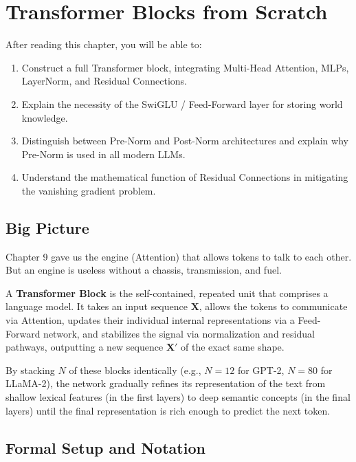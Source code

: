 \chapter{Transformer Blocks from Scratch}
\label{ch:10}

\begin{keyinsight}
After reading this chapter, you will be able to:
\begin{enumerate}
  \item Construct a full Transformer block, integrating Multi-Head Attention, MLPs, LayerNorm, and Residual Connections.
  \item Explain the necessity of the SwiGLU / Feed-Forward layer for storing world knowledge.
  \item Distinguish between Pre-Norm and Post-Norm architectures and explain why Pre-Norm is used in all modern LLMs.
  \item Understand the mathematical function of Residual Connections in mitigating the vanishing gradient problem.
\end{enumerate}
\end{keyinsight}

\section{Big Picture}
\label{ch:10:sec:big_picture}

Chapter 9 gave us the engine (Attention) that allows tokens to talk to each other. But an engine is useless without a chassis, transmission, and fuel. 

A \textbf{Transformer Block} is the self-contained, repeated unit that comprises a language model. It takes an input sequence $\mathbf{X}$, allows the tokens to communicate via Attention, updates their individual internal representations via a Feed-Forward network, and stabilizes the signal via normalization and residual pathways, outputting a new sequence $\mathbf{X}'$ of the exact same shape.

By stacking $N$ of these blocks identically (e.g., $N=12$ for GPT-2, $N=80$ for LLaMA-2), the network gradually refines its representation of the text from shallow lexical features (in the first layers) to deep semantic concepts (in the final layers) until the final representation is rich enough to predict the next token.

\section{Formal Setup and Notation}
\label{ch:10:sec:setup}

